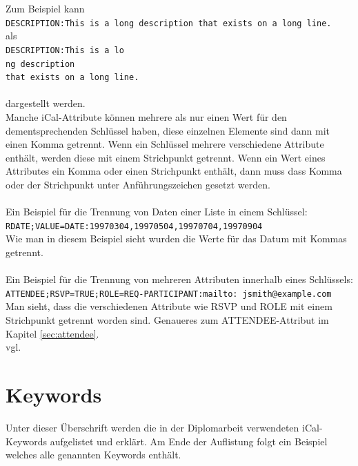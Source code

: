 Zum Beispiel kann\vspace*{2mm}\\
\texttt{DESCRIPTION:This is a long description that exists on a long line.}\vspace*{2mm}\\als\vspace*{2mm}\\
\texttt{DESCRIPTION:This is a lo\\ 
 ng description\\  
  that exists on a long line.}\\\\
dargestellt werden.\vspace*{2mm}\\
Manche iCal-Attribute können mehrere als nur einen Wert für den dementsprechenden Schlüssel haben, diese einzelnen Elemente sind dann mit einen Komma getrennt. Wenn ein Schlüssel mehrere verschiedene Attribute enthält, werden diese mit einem Strichpunkt getrennt. Wenn ein Wert eines Attributes ein Komma oder einen Strichpunkt enthält, dann muss dass Komma oder der Strichpunkt unter Anführungszeichen gesetzt werden.\\\\
Ein Beispiel für die Trennung von Daten einer Liste in einem Schlüssel:\vspace*{2mm}\\
\texttt{RDATE;VALUE=DATE:19970304,19970504,19970704,19970904}\vspace*{2mm}\\
Wie man in diesem Beispiel sieht wurden die Werte für das Datum mit Kommas getrennt.\\\\
Ein Beispiel für die Trennung von mehreren Attributen innerhalb eines Schlüssels:\vspace*{2mm}\\
\texttt{ATTENDEE;RSVP=TRUE;ROLE=REQ-PARTICIPANT:mailto:
jsmith@example.com}\vspace*{2mm}\\Man sieht, dass die verschiedenen Attribute wie RSVP und ROLE mit einem Strichpunkt getrennt worden sind. Genaueres zum ATTENDEE-Attribut im Kapitel \ref{sec:attendee}. 
\\vgl. \textcite{iCalDocumentation} 

\pagebreak
\renewcommand{\theauthor}{Dario Wagner}
\section{Keywords}
\label{sec:keywords}
Unter dieser Überschrift werden die in der Diplomarbeit verwendeten iCal-Keywords aufgelistet und erklärt. Am Ende der Auflistung folgt ein Beispiel welches alle genannten Keywords enthält. 
